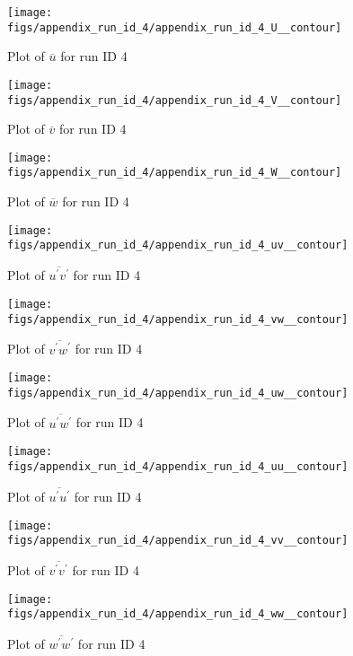 \begin{figure}[H]
\centering
\texttt{[image: figs/appendix\_run\_id\_4/appendix\_run\_id\_4\_U\_\_contour]}
\caption{Plot of $\overline{u}$ for run ID 4}
\label{fig:appendix_run_id_4_U__contour}
\end{figure}


\begin{figure}[H]
\centering
\texttt{[image: figs/appendix\_run\_id\_4/appendix\_run\_id\_4\_V\_\_contour]}
\caption{Plot of $\overline{v}$ for run ID 4}
\label{fig:appendix_run_id_4_V__contour}
\end{figure}


\begin{figure}[H]
\centering
\texttt{[image: figs/appendix\_run\_id\_4/appendix\_run\_id\_4\_W\_\_contour]}
\caption{Plot of $\overline{w}$ for run ID 4}
\label{fig:appendix_run_id_4_W__contour}
\end{figure}


\begin{figure}[H]
\centering
\texttt{[image: figs/appendix\_run\_id\_4/appendix\_run\_id\_4\_uv\_\_contour]}
\caption{Plot of $\overline{u^\prime v^\prime}$ for run ID 4}
\label{fig:appendix_run_id_4_uv__contour}
\end{figure}


\begin{figure}[H]
\centering
\texttt{[image: figs/appendix\_run\_id\_4/appendix\_run\_id\_4\_vw\_\_contour]}
\caption{Plot of $\overline{v^\prime w^\prime}$ for run ID 4}
\label{fig:appendix_run_id_4_vw__contour}
\end{figure}


\begin{figure}[H]
\centering
\texttt{[image: figs/appendix\_run\_id\_4/appendix\_run\_id\_4\_uw\_\_contour]}
\caption{Plot of $\overline{u^\prime w^\prime}$ for run ID 4}
\label{fig:appendix_run_id_4_uw__contour}
\end{figure}


\begin{figure}[H]
\centering
\texttt{[image: figs/appendix\_run\_id\_4/appendix\_run\_id\_4\_uu\_\_contour]}
\caption{Plot of $\overline{u^\prime u^\prime}$ for run ID 4}
\label{fig:appendix_run_id_4_uu__contour}
\end{figure}


\begin{figure}[H]
\centering
\texttt{[image: figs/appendix\_run\_id\_4/appendix\_run\_id\_4\_vv\_\_contour]}
\caption{Plot of $\overline{v^\prime v^\prime}$ for run ID 4}
\label{fig:appendix_run_id_4_vv__contour}
\end{figure}


\begin{figure}[H]
\centering
\texttt{[image: figs/appendix\_run\_id\_4/appendix\_run\_id\_4\_ww\_\_contour]}
\caption{Plot of $\overline{w^\prime w^\prime}$ for run ID 4}
\label{fig:appendix_run_id_4_ww__contour}
\end{figure}


